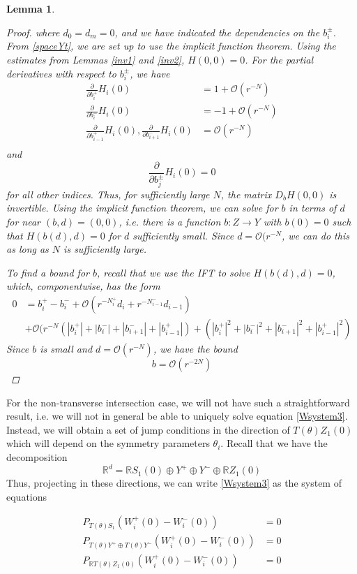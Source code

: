 \documentclass[12pt]{article}
\def\R{{\mathbb R}}
\newtheorem{lemma}{Lemma}
\begin{document}
\begin{lemma}
\begin{proof}
where $d_0 = d_m = 0$, and we have indicated the dependencies on the $b_i^\pm$. From \eqref{spaceYt}, we are set up to use the implicit function theorem. Using the estimates from Lemmas \ref{inv1} and \ref{inv2}, $H(0, 0) = 0$. For the partial derivatives with respect to $b_i^\pm$, we have
\begin{align*}
\frac{\partial}{\partial b_i^+}H_i(0) &= 1 + \mathcal{O}(r^{-N})  \\
\frac{\partial}{\partial b_i^-}H_i(0) &= -1 + \mathcal{O}(r^{-N}) \\
\frac{\partial}{\partial b_{i-1}^+}H_i(0),
\frac{\partial}{\partial b_{i+1}^-}H_i(0) &= \mathcal{O}(r^{-N}) \\
\end{align*}
and 
\[
\frac{\partial}{\partial b_j^\pm}H_i(0) = 0
\]
for all other indices. Thus, for sufficiently large $N$, the matrix $D_b H(0,0)$ is invertible. Using the implicit function theorem, we can solve for $b$ in terms of $d$ for near $(b,d) = (0, 0)$, i.e. there is a function $b: Z \rightarrow Y$ with $b(0) = 0$ such that $H(b(d),d) = 0$ for $d$ sufficiently small. Since $d = \mathcal{O}(r^{-N}$, we can do this as long as $N$ is sufficiently large.

To find a bound for $b$, recall that we use the IFT to solve $H(b(d),d) = 0$, which, componentwise, has the form
\begin{align*}
0 &= b_i^+ - b_i^- + \mathcal{O}(r^{-N_i^+} d_i + r^{-N_{i-1}^-} d_{i-1}) \\
&+ \mathcal{O}( r^{-N}(|b_i^+| + |b_i^-| + |b_{i+1}^-| + |b_{i-1}^+|)
+ (|b_i^+|^2 + |b_i^-|^2 + |b_{i+1}^-|^2 + |b_{i-1}^+|^2)
\end{align*}
Since $b$ is small and $d = \mathcal{O}(r^{-N})$, we have the bound
\[
b = \mathcal{O}(r^{-2N})
\]
\end{proof}
\end{lemma}

For the non-transverse intersection case, we will not have such a straightforward result, i.e. we will not in general be able to uniquely solve equation \eqref{Wsystem3}. Instead, we will obtain a set of jump conditions in the direction of $T(\theta) Z_1(0)$ which will depend on the symmetry parameters $\theta_i$. Recall that we have the decomposition
\[
\R^d = \R S_1(0) \oplus Y^+ \oplus Y^- \oplus \R Z_1(0)
\]
Thus, projecting in these directions, we can write \eqref{Wsystem3} as the system of equations

\begin{align}
P_{T(\theta)S_1}\left( W_i^+(0) - W_i^-(0) \right) &= 0 \label{jumpS1} \\
P_{T(\theta)Y^+ \oplus T(\theta)Y^-}\left( W_i^+(0) - W_i^-(0) \right) &= 0 \label{jumpnonZ} \\
P_{\R T(\theta)Z_1(0)} \left( W_i^+(0) - W_i^-(0) \right) &= 0 \label{jumpZ}
\end{align}
\end{document}

